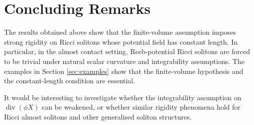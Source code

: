 \documentclass[a4paper, twoside, 10pt]{article}
\numberwithin{equation}{section}
\theoremstyle{definition}
\begin{document}
\section*{Concluding Remarks}

The results obtained above show that the finite-volume assumption imposes
strong rigidity on Ricci solitons whose potential field has constant
length. In particular, in the almost contact setting, Reeb-potential
Ricci solitons are forced to be trivial under natural scalar curvature
and integrability assumptions. The examples in Section \ref{sec:examples} show that the finite-volume hypothesis and the constant-length condition
are essential.

It would be interesting to investigate whether the integrability
assumption on $\operatorname{div}(\phi X)$ can be weakened, or whether similar rigidity phenomena hold for Ricci almost solitons and other generalised soliton structures.



\end{document}
